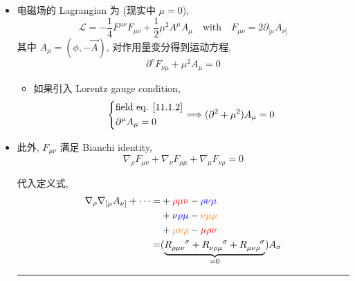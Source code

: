 \begin{itemize}
	\item 电磁场的 Lagrangian 为 (现实中 $\mu = 0$),
	\begin{equation} \label{11.1.1}
		\mathcal{L} = - \frac{1}{4} F^{\mu \nu} F_{\mu \nu} + \frac{1}{2} \mu^2 A^\mu A_\mu \quad \text{with} \quad F_{\mu \nu} = 2 \partial_{[\mu} A_{\nu]}
	\end{equation}
	其中 $A_\mu = (\phi, - \vec{A})$, 对作用量变分得到运动方程,
	\begin{equation} \label{11.1.2}
		\partial^\nu F_{\nu \mu} + \mu^2 A_\mu = 0
	\end{equation}
	\begin{itemize}
		\item 如果引入 Lorentz gauge condition,
		\begin{equation}
			\begin{dcases}
				\text{field eq. \eqref{11.1.2}} \\
				\partial^\mu A_\mu = 0
			\end{dcases} \Longrightarrow (\partial^2 + \mu^2) A_\mu = 0
		\end{equation}
	\end{itemize}
	
	\item 此外, $F_{\mu \nu}$ 满足 Bianchi identity,
	\begin{equation} \label{11.1.4}
		\nabla_\rho F_{\mu \nu} + \nabla_\nu F_{\rho \mu} + \nabla_\mu F_{\nu \rho} = 0
	\end{equation}
	
	\begin{tcolorbox}[title=calculation:]
		代入定义式,
		\begin{align}
			\nabla_\rho \nabla_{[\mu} A_{\nu]} + \cdots =& + \mathcolor{red}{\rho \mu \nu} - \mathcolor{blue}{\rho \nu \mu} \notag \\
			& + \mathcolor{blue}{\nu \rho \mu} - \mathcolor{orange}{\nu \mu \rho} \notag \\
			& + \mathcolor{orange}{\mu \nu \rho} - \mathcolor{red}{\mu \rho \nu} \notag \\
			=& (\underbrace{\tensor{R}{_{\rho \mu \nu}^\sigma} + \tensor{R}{_{\nu \rho \mu}^\sigma} + \tensor{R}{_{\mu \nu \rho}^\sigma}}_{= 0}) A_\sigma
		\end{align}
	\end{tcolorbox}
	
	\noindent\rule[0.5ex]{\linewidth}{0.5pt} %
	

\end{itemize}
